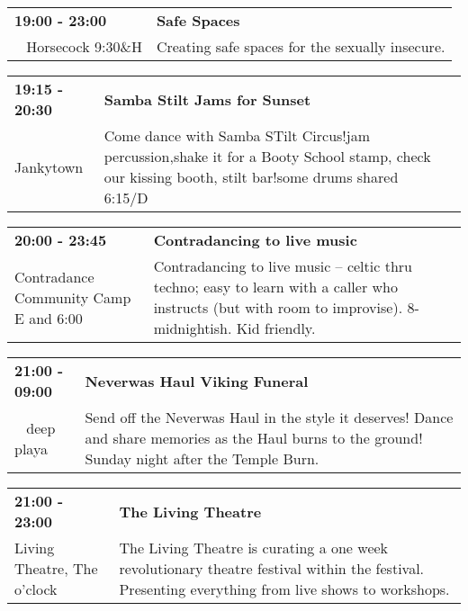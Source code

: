 \begin{tabular}{ p{1in} p{2.2in} }
    \textbf{19:00 - 23:00} & \textbf{Safe Spaces} \\
    ~ \newline Horsecock 9:30\&H & Creating safe spaces for the sexually insecure. \\
    \hline 
\end{tabular}
    
\begin{tabular}{ p{1in} p{2.2in} }
    \textbf{19:15 - 20:30} & \textbf{Samba Stilt Jams for Sunset} \\
    Jankytown \newline  & Come dance with Samba STilt Circus!jam percussion,shake it for a Booty School stamp, check our kissing booth, stilt bar!some drums shared~ 6:15/D \\
    \hline 
\end{tabular}
    
\begin{tabular}{ p{1in} p{2.2in} }
    \textbf{20:00 - 23:45} & \textbf{Contradancing to live music} \\
    Contradance Community Camp \newline E  and 6:00 & Contradancing to live music -- celtic thru techno; easy to learn with a caller who instructs (but with room to improvise). 8-midnightish. Kid friendly. \\
    \hline 
\end{tabular}
    
\begin{tabular}{ p{1in} p{2.2in} }
    \textbf{21:00 - 09:00} & \textbf{Neverwas Haul Viking Funeral} \\
    ~ \newline deep playa & Send off the Neverwas Haul in the style it deserves! Dance and share memories as the Haul burns to the ground! Sunday night after the Temple Burn. \\
    \hline 
\end{tabular}
    
\begin{tabular}{ p{1in} p{2.2in} }
    \textbf{21:00 - 23:00} & \textbf{The Living Theatre} \\
    Living Theatre, The \newline 6 o'clock & The Living Theatre is curating a one week revolutionary theatre festival within the festival. Presenting everything from live shows to workshops. \\
    \hline 
\end{tabular}
    
